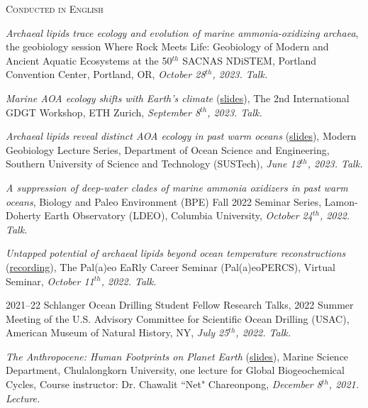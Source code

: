 \documentclass[10pt]{article}
\newcommand{\margintext}[1]{\marginnote{\normalsize\textbf #1 |}}
\begin{document}
\bigskip
\margintext{Invited Talks \& Lectures}
\textsc{Conducted in English}
\begin{etaremune}

\item \textit{Archaeal lipids trace ecology and evolution of marine ammonia-oxidizing archaea}, the geobiology session Where Rock Meets Life: Geobiology of Modern and Ancient Aquatic Ecosystems at the 50$^{th}$ SACNAS NDiSTEM, Portland Convention Center, Portland, OR, \textit{October 28$^{th}$, 2023. Talk.}

\item \textit{Marine AOA ecology shifts with Earth’s climate} (\href{https://tamucs-my.sharepoint.com/:b:/g/personal/rrattan_tamu_edu/EZQsnDcppXpAkxq9H8E_L1YBK_Jnd2zL1lPQwsRLIZZ_xw?e=ilpAa1}{slides}), The 2nd International GDGT Workshop, ETH Zurich, \textit{September 8$^{th}$, 2023. Talk.}

\item \textit{Archaeal lipids reveal distinct AOA ecology in past warm oceans} (\href{https://tamucs-my.sharepoint.com/:b:/g/personal/rrattan_tamu_edu/ET9FxsRS79dBv4giDLNmCKIB0X_tnPspwI18D1e8uKEFLw?e=6On32v}{slides}), Modern Geobiology Lecture Series, Department of Ocean Science and Engineering, Southern University of Science and Technology (SUSTech), \textit{June 12$^{th}$, 2023. Talk.}

\item \textit{A suppression of deep-water clades of marine ammonia oxidizers in past warm oceans}, Biology and Paleo Environment (BPE) Fall 2022 Seminar Series, Lamon-Doherty Earth Observatory (LDEO), Columbia University, \textit{October 24$^{th}$, 2022. Talk.}

\item \textit{Untapped potential of archaeal lipids beyond ocean temperature reconstructions} (\href{https://www.youtube.com/watch?v=95o7ogv_T9I}{recording}), The Pal(a)eo EaRly Career Seminar (Pal(a)eoPERCS), Virtual Seminar, \textit{October 11$^{th}$, 2022. Talk.}

\item 2021–22 Schlanger Ocean Drilling Student Fellow Research Talks, 2022 Summer Meeting of the U.S. Advisory Committee for Scientific Ocean Drilling (USAC), American Museum of Natural History, NY, \textit{July 25$^{th}$, 2022. Talk.}

\item \textit{The Anthropocene: Human Footprints on Planet Earth} (\href{https://docs.google.com/presentation/d/1XTTknlXZghoFSpxdI-8KNPqmwrOvbwUQ9sDqNNvJDf0/edit?usp=sharing}{slides}), Marine Science Department, Chulalongkorn University, one lecture for Global Biogeochemical Cycles, Course instructor: Dr. Chawalit ``Net" Chareonpong, \textit{December 8$^{th}$, 2021. Lecture.}
\end{etaremune}
\end{document}
